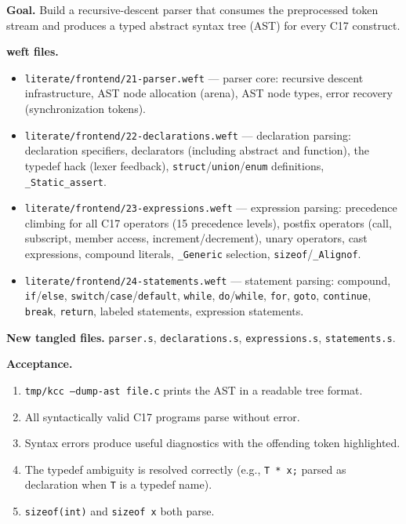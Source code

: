 \documentclass[11pt,a4paper,twoside,openright,DIV=15]{scrbook}
\theoremstyle{definition}
\theoremstyle{plain}
\theoremstyle{remark}
\begin{document}
\textbf{Goal.}  Build a recursive-descent parser that consumes
the preprocessed token stream and produces a typed abstract syntax
tree (AST) for every C17 construct.

\textbf{weft files.}
\begin{itemize}
\item \texttt{literate/frontend/21-parser.weft} ---
      parser core: recursive descent infrastructure, AST node
      allocation (arena), AST node types, error recovery
      (synchronization tokens).
\item \texttt{literate/frontend/22-declarations.weft} ---
      declaration parsing: declaration specifiers, declarators
      (including abstract and function), the typedef hack
      (lexer feedback), \texttt{struct}/\texttt{union}/\texttt{enum}
      definitions, \texttt{\_Static\_assert}.
\item \texttt{literate/frontend/23-expressions.weft} ---
      expression parsing: precedence climbing for all C17
      operators (15 precedence levels), postfix operators
      (call, subscript, member access, increment/decrement),
      unary operators, cast expressions, compound literals,
      \texttt{\_Generic} selection, \texttt{sizeof}/\texttt{\_Alignof}.
\item \texttt{literate/frontend/24-statements.weft} ---
      statement parsing: compound, \texttt{if}/\texttt{else},
      \texttt{switch}/\texttt{case}/\texttt{default},
      \texttt{while}, \texttt{do}/\texttt{while}, \texttt{for},
      \texttt{goto}, \texttt{continue}, \texttt{break},
      \texttt{return}, labeled statements, expression statements.
\end{itemize}

\textbf{New tangled files.}
\texttt{parser.s}, \texttt{declarations.s},
\texttt{expressions.s}, \texttt{statements.s}.

\textbf{Acceptance.}
\begin{enumerate}
\item \texttt{tmp/kcc --dump-ast file.c} prints the AST in a
      readable tree format.
\item All syntactically valid C17 programs parse without error.
\item Syntax errors produce useful diagnostics with the
      offending token highlighted.
\item The typedef ambiguity is resolved correctly (e.g.,
      \texttt{T * x;} parsed as declaration when \texttt{T} is
      a typedef name).
\item \texttt{sizeof(int)} and \texttt{sizeof x} both parse.
\end{enumerate}
\end{document}
